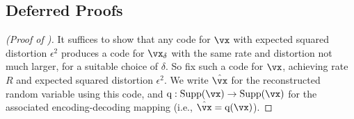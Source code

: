 \documentclass[../../book-main.tex]{subfiles}
\begin{document}
\subsection{Deferred Proofs}\label{sec:app-rate-dist-deferred-proofs}

\begin{proof}[(Proof of )]
    It suffices to show that any code for $\vx$ with expected squared distortion
    $\epsilon^2$ produces a code for $\vx_{\delta}$ with the same rate and
    distortion not much larger, for a suitable choice of $\delta$.
    So fix such a code for $\vx$, achieving rate $R$ and expected squared
    distortion $\epsilon^2$. We write $\hat{\vx}$ for the reconstructed random
    variable using this code, and $\mathrm{q} : \Supp(\vx) \to \Supp(\vx)$
    for the associated encoding-decoding mapping (i.e., $\hat{\vx}
    = \mathrm{q}(\vx)$).


\end{proof}
\end{document}

